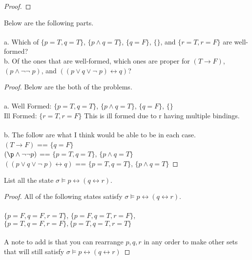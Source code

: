 \documentclass[12pt]{article}
\newenvironment{exercise}[2][Exercise]{\begin{trivlist}
\item[\hskip \labelsep {\bfseries #1}\hskip \labelsep {\bfseries #2.}]}{\end{trivlist}}
\begin{document}
\begin{proof}
\end{proof}

\begin{exercise}{19}
Below are the following parts. \\ \\
a. Which of $\{p = T, q = T\}$, $\{p \land q = T\}$, $\{q = F\}$, $\{ \}$, and $\{r = T, r = F\}$ are well-formed? \\ 
b. Of the ones that are well-formed, which ones are proper for $(T \rightarrow F)$, $(p \land \neg \neg\; p)$, and $((p \lor q \lor \neg\; p) \leftrightarrow q)$?
\end{exercise}

\begin{proof}
Below are the both of the problems. \\ \\
a. Well Formed: $\{ p = T, q = T\}$, $\{p \land q = T\}$, $\{q = F\}$, $\{ \}$ \\ 
Ill Formed: $\{ r = T, r = F\}$ This is ill formed due to r having multiple bindings. \\ \\
b. The follow are what I think would be able to be in  each case. \\ 
$(T \rightarrow F)$ == $\{ q = F\}$ \\
$(\p \land \neg \neg p)$ == $\{ p = T, q = T \}$, $\{p \land q = T \}$ \\
$((p \lor q \lor \neg\; p) \leftrightarrow q)$ == $\{ p = T, q = T\}$, $\{ p \land q = T\}$

\end{proof}

\begin{exercise}{20}
List all the state $\sigma \models p \leftrightarrow (q \leftrightarrow r)$.
\end{exercise}

\begin{proof}
All of the following states satisfy $\sigma \models p \leftrightarrow (q \leftrightarrow r)$. \\ \\
$\{p = F, q = F, r = T\}$, $\{p = F, q = T, r = F\}$, $\{p = T, q = F, r = F\}, \{p = T, q = T, r = T\}$ \\ \\ 
A note to add is that you can rearrange $p, q, r$ in any order to make other sets that will still satisfy $\sigma \models p \leftrightarrow (q \leftrightarrow r)$

\end{proof}
\end{document}
